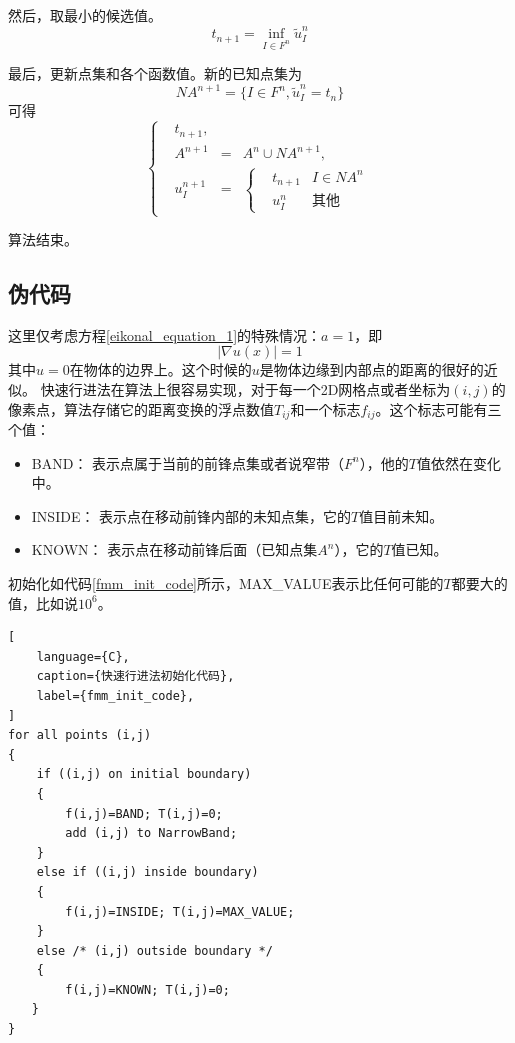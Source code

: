 然后，取最小的候选值。
\begin{equation*}
    \label{min_tn+1}
    t_{n+1} = \underset{I \in F^n}{\inf} \widetilde{u}^n_I
\end{equation*}

最后，更新点集和各个函数值。新的已知点集为
\begin{equation*}
    \label{new_an+1}
    NA^{n+1} = \{I \in F^n, \widetilde{u}^n_I = t_n\}
\end{equation*}
可得
\begin{equation*}
    \label{new_values}
    \left\{
    \begin{aligned}
    & t_{n+1},\\
    & A^{n+1} & = & A^n \cup NA^{n+1}, \\
    & u^{n+1}_I & = & \left\{
        \begin{aligned}
        & t_{n+1} & I \in NA^n \\
        & u^n_I & \mbox{其他}
        \end{aligned}
        \right.
    \end{aligned}
    \right.
\end{equation*}

算法结束。

\subsection{伪代码}
\label{pseudocode}
这里仅考虑方程\ref{eikonal_equation_1}的特殊情况：$a = 1$，即
\begin{equation}
    \label{special_eikonal_equation}
    \left| \nabla u(x) \right| = 1
\end{equation}
其中$u = 0$在物体的边界上。这个时候的$u$是物体边缘到内部点的距离的很好的近似。
快速行进法在算法上很容易实现，对于每一个2D网格点或者坐标为$(i, j)$的像素点，算法存储它的距离变换的浮点数值$T_{ij}$和一个标志$f_{ij}$。这个标志可能有三个值：
\begin{itemize}
\item BAND： 表示点属于当前的前锋点集或者说窄带（$F^n$），他的$T$值依然在变化中。
\item INSIDE： 表示点在移动前锋内部的未知点集，它的$T$值目前未知。
\item KNOWN： 表示点在移动前锋后面（已知点集$A^n$），它的$T$值已知。
\end{itemize}

初始化如代码\ref{fmm_init_code}所示，MAX\_VALUE表示比任何可能的$T$都要大的值，比如说$10^6$。
\begin{lstlisting}[
    language={C},
    caption={快速行进法初始化代码},
    label={fmm_init_code},
]
for all points (i,j)
{
    if ((i,j) on initial boundary)
    {
        f(i,j)=BAND; T(i,j)=0;
        add (i,j) to NarrowBand;
    }
    else if ((i,j) inside boundary)
    {
        f(i,j)=INSIDE; T(i,j)=MAX_VALUE;
    }
    else /* (i,j) outside boundary */
    {
        f(i,j)=KNOWN; T(i,j)=0;
　　}
}
\end{lstlisting}

